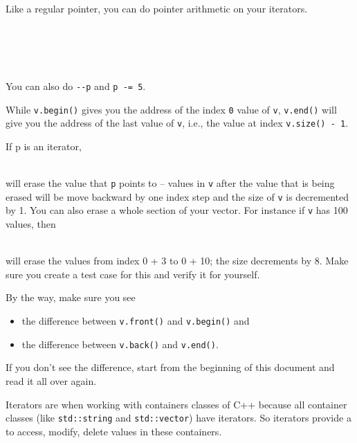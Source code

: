 Like a regular pointer, you can do pointer arithmetic on your iterators.

\\
\\
\\
\\

You can also do \verb!--p! and \verb!p -= 5!.

While \verb!v.begin()! gives you the address of the index \verb!0! value of \verb!v!, \verb!v.end()! will give you the address of the last value of \verb!v!, i.e., the value at index \verb!v.size() - 1!.

If p is an iterator,

\\

will erase the value that \texttt{p} points to -- values in \texttt{v} after
the value that is being erased will be move backward by one index step
and the size of \texttt{v} is decremented by 1. You can also erase a whole
section of your vector. For instance if \texttt{v} has 100 values, then

\\

will erase the values from index 0 + 3 to 0 + 10; the size decrements by
8. Make sure you create a test case for this and verify it for yourself.

By the way, make sure you see

\begin{itemize}
\item
  the difference between \texttt{v.front()} and \texttt{v.begin()} and
\item
  the difference between \texttt{v.back()} and \texttt{v.end()}.
\end{itemize}

If you don't see the difference, start from the beginning of this
document and read it all over again.

Iterators are  when working with containers classes of C++ because all container classes (like \verb!std::string! and \verb!std::vector!) have iterators. So iterators provide a  to access, modify, delete values in these containers.

